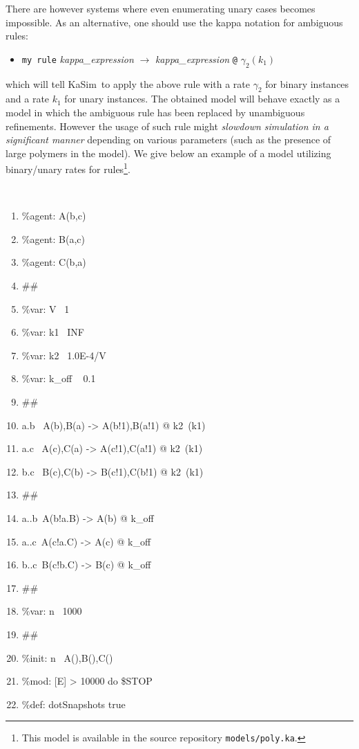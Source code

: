\documentclass[11pt]{book}
\def\KaSim{\textsf{KaSim}}
\def\ttt#1{\texttt{#1}}
\def\var#1{{\textquotesingle}#1{\textquotesingle}}
\def\rar{\rightarrow}
\def\ga{\gamma}
\def\ITE#1{\begin{itemize}#1\end{itemize}}
\begin{document}
There are however systems where even enumerating unary cases becomes impossible. As an alternative, one should use the kappa notation for ambiguous rules: 
\ITE{
\item[] \ttt{{\textquotesingle}my rule{\textquotesingle}} {\it kappa\_expression} $\rar$ {\it kappa\_expression} \ttt{@} $\ga_2(k_1)$  
}
which will tell \KaSim~to apply the above rule with a rate $\ga_2$ for binary instances and a rate $k_1$ for unary instances. The obtained model will behave exactly as a model in which the ambiguous rule has been replaced by unambiguous refinements. However the usage of such rule might \emph{slowdown simulation in a significant manner} depending on various parameters (such as the presence of large polymers in the model). We give below an example of a model utilizing binary/unary rates for rules\footnote{This model is available in the source repository \ttt{models/poly.ka}.}.

{\tt\footnotesize
\begin{enumerate}
\item \%agent: A(b,c)
\item \%agent: B(a,c)
\item \%agent: C(b,a)
\item \#\#
\item \%var: \var{V}~  1
\item \%var: \var{k1}~  INF
\item \%var: \var{k2}~ 1.0E-4/\var{V} 
\item \%var: \var{k\_off} ~ 0.1
\item \#\#
\item \var{a.b}~ A(b),B(a) -> A(b!1),B(a!1) @ \var{k2}~(\var{k1})
\item \var{a.c}~ A(c),C(a) -> A(c!1),C(a!1) @ \var{k2}~(\var{k1})
\item \var{b.c}~ B(c),C(b) -> B(c!1),C(b!1) @ \var{k2}~(\var{k1})
\item \#\#
\item \var{a..b}~A(b!a.B) -> A(b) @ \var{k\_off} 
\item \var{a..c}~A(c!a.C) -> A(c) @ \var{k\_off}
\item \var{b..c}~B(c!b.C) -> B(c) @ \var{k\_off} 
\item \#\#
\item \%var: \var{n}~  1000
\item \#\#
\item \%init: \var{n}~  A(),B(),C()
\item \%mod: [E] > 10000 do \$STOP 
\item \%def: \var{\var{dotSnapshots}} \var{\var{true}}
\end{enumerate}
}
\end{document}
